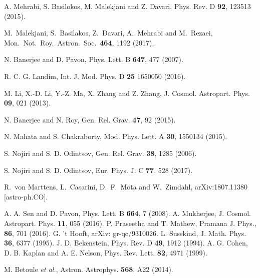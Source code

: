 \documentclass[11pt]{article}
\begin{document}
\begin{thebibliography}{}
A. Mehrabi, S. Basilokos, M. Malekjani and Z. Davari, Phys. Rev. D {\bf 92}, 123513 (2015).


  M.~Malekjani, S.~Basilakos, Z.~Davari, A.~Mehrabi and M.~Rezaei,
  Mon.\ Not.\ Roy.\ Astron.\ Soc.\  {\bf 464}, 1192 (2017).





N. Banerjee and D. Pavon, Phys. Lett. B {\bf 647}, 477 (2007).

R. C. G. Landim, Int. J. Mod. Phys. D {\bf 25} 1650050 (2016).

M. Li, X.-D. Li, Y.-Z. Ma, X. Zhang and  Z. Zhang, J. Cosmol. Astropart. Phys. {\bf 09}, 021 (2013).

N. Banerjee and N. Roy, Gen. Rel. Grav. {\bf 47}, 92 (2015).

N. Mahata and S. Chakraborty, Mod. Phys. Lett. A {\bf 30}, 1550134 (2015).

 S. Nojiri and S. D. Odintsov, Gen. Rel. Grav. {\bf 38}, 1285 (2006).

 S. Nojiri and S. D. Odintsov, Eur. Phys. J. C {\bf 77}, 528 (2017).

  R.~von Marttens, L.~Casarini, D.~F.~Mota and W.~Zimdahl,
  arXiv:1807.11380 [astro-ph.CO].

A. A. Sen and D. Pavon, Phys. Lett. B {\bf 664}, 7 (2008).
 A. Mukherjee, J. Cosmol. Astropart. Phys. {\bf 11}, 055 (2016).
P. Praseetha and T. Mathew, Pramana J. Phys., {\bf 86}, 701 (2016).
G. 't Hooft, arXiv: gr-qc/9310026.
L. Susskind, J. Math. Phys. {\bf 36}, 6377 (1995).
J. D. Bekenstein, Phys. Rev. D {\bf 49}, 1912 (1994).
A. G. Cohen, D. B. Kaplan and A. E. Nelson, Phys. Rev. Lett. {\bf 82}, 4971 (1999).





M. Betoule {\it et al.}, Astron. Astrophys. {\bf 568}, A22 (2014).



\end{thebibliography}
\end{document}
